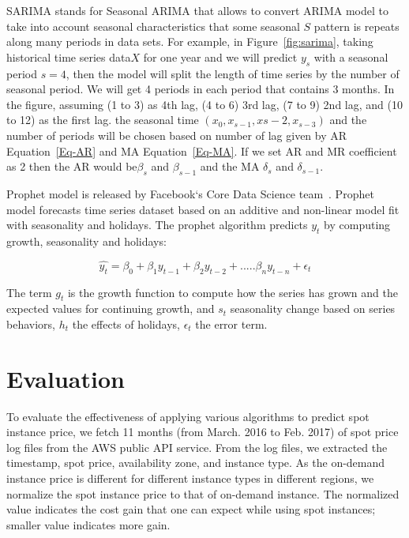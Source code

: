 \documentclass[graybox]{svmult}
\begin{document}
SARIMA stands for Seasonal ARIMA that allows to convert ARIMA model to take into account seasonal characteristics that some seasonal \(S\) pattern is repeats along many periods in data sets. For example, in Figure~\ref{fig:sarima}, taking historical time series data\(X\) for one year and we will predict \(y_s\) with a seasonal period \(s= 4\), then the model will split the length of time series by the number of seasonal period. We will get 4 periods in each period that contains 3 months. In the figure, assuming (1 to 3) as 4th lag, (4 to 6) 3rd lag, (7 to 9) 2nd lag, and (10 to 12) as the first lag. the seasonal time \( (x_{0}, x_{{s-1}}, x{{s-2}}, x_{{s-3}} )\) and the number of periods will be chosen based on number of lag given by AR Equation~\ref{Eq-AR} and MA Equation~\ref{Eq-MA}. If we set AR and MR coefficient as 2 then the AR would be\(\beta_{s}\) and \(\beta_{s-1}\) and the MA \(\delta_{s}\) and \(\delta_{s-1}\).

Prophet model is released by Facebook`s Core Data Science team~\cite{prophet}. Prophet model forecasts time series dataset based on an additive and non-linear model fit with seasonality and holidays. The prophet algorithm predicts \(y_t\) by computing growth, seasonality and holidays:

\begin{equation}
\hat{y_t} = \beta_0 +\beta_1 y_{t-1}+ \beta_2 y_{t-2}+.....\beta_n y_{t-n}+\epsilon_t
\label{Eq-prophet}
\end{equation}

The term \(g_t\) is the growth function to compute how the series has grown and the expected values for continuing growth, and \(s_t\) seasonality change based on series behaviors, \(h_t\) the effects of holidays, \(\epsilon_t\) the error term.

\section{Evaluation}
To evaluate the effectiveness of applying various algorithms to predict spot instance price, we fetch 11 months (from March. 2016 to Feb. 2017) of spot price log files from the AWS public API service. From the log files, we extracted the timestamp, spot price, availability zone, and instance type. As the on-demand instance price is different for different instance types in different regions, we normalize the spot instance price to that of on-demand instance. The normalized value indicates the cost gain that one can expect while using spot instances; smaller value indicates more gain.
\end{document}
